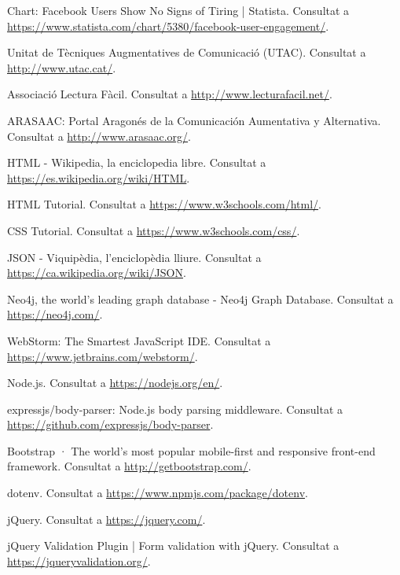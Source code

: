 \documentclass[11pt,catalan,listoffigures,listoftables]{tfgetsinf}
\begin{document}
\begin{thebibliography}{10}
   Chart: Facebook Users Show No Signs of Tiring | Statista.
   \newblock Consultat a 
   \url{https://www.statista.com/chart/5380/facebook-user-engagement/}.
   
   Unitat de Tècniques Augmentatives de Comunicació (UTAC).
   \newblock Consultat a 
   \url{http://www.utac.cat/}.   

   Associació Lectura Fàcil.
   \newblock Consultat a 
   \url{http://www.lecturafacil.net/}.
   
   ARASAAC: Portal Aragonés de la Comunicación Aumentativa y Alternativa.
   \newblock Consultat a 
   \url{http://www.arasaac.org/}.
   
   HTML - Wikipedia, la enciclopedia libre.
   \newblock Consultat a 
   \url{https://es.wikipedia.org/wiki/HTML}.     
   
   HTML Tutorial.
   \newblock Consultat a 
   \url{https://www.w3schools.com/html/}.   
   
   CSS Tutorial.
   \newblock Consultat a 
   \url{https://www.w3schools.com/css/}.  

   JSON - Viquipèdia, l'enciclopèdia lliure.
   \newblock Consultat a 
   \url{https://ca.wikipedia.org/wiki/JSON}.     
   
   Neo4j, the world's leading graph database - Neo4j Graph Database.
   \newblock Consultat a 
   \url{https://neo4j.com/}.
   
   WebStorm: The Smartest JavaScript IDE.
   \newblock Consultat a 
   \url{https://www.jetbrains.com/webstorm/}.

   Node.js.
   \newblock Consultat a 
   \url{https://nodejs.org/en/}.

   expressjs/body-parser: Node.js body parsing middleware.
   \newblock Consultat a 
   \url{https://github.com/expressjs/body-parser}.   
   
   Bootstrap · The world's most popular mobile-first and responsive front-end framework.
   \newblock Consultat a 
   \url{http://getbootstrap.com/}.

   dotenv.
   \newblock Consultat a 
   \url{https://www.npmjs.com/package/dotenv}.    
   
   jQuery.
   \newblock Consultat a 
   \url{https://jquery.com/}.

   jQuery Validation Plugin | Form validation with jQuery.
   \newblock Consultat a 
   \url{https://jqueryvalidation.org/}.   


\end{thebibliography}
\end{document}

